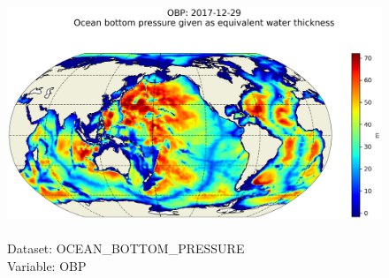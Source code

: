 \begin{figure}[H]
\centering
\includegraphics[scale=0.5]{../images/plots/latlon_plots/Ocean_Bottom_Pressure/OBP.png}
\caption{\\Dataset: OCEAN\_BOTTOM\_PRESSURE\\Variable: OBP}
\label{tab:table-OCEAN_BOTTOM_PRESSURE_OBP-Plot}
\end{figure}
\pagebreak
